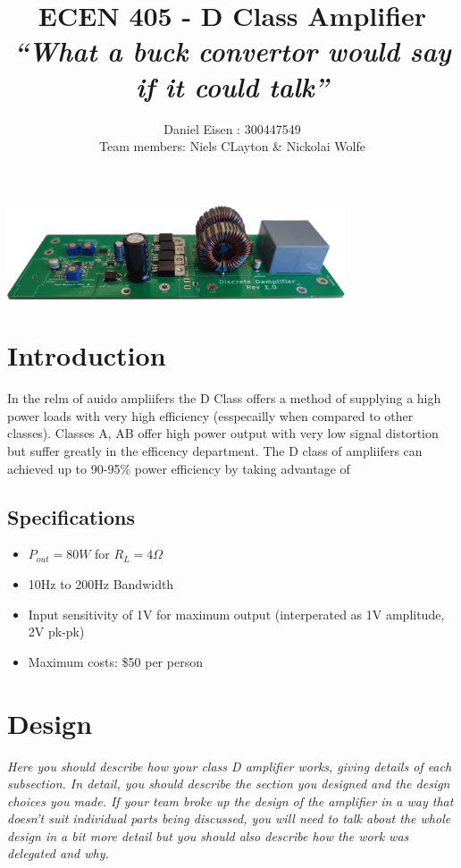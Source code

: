 \documentclass[11pt]{article}
\title{ECEN 405 -  D Class Amplifier \\ \large{\textit{``What a buck convertor would say if it could talk''}} }
\author{Daniel Eisen : 300447549 \\Team members: Niels CLayton \& Nickolai Wolfe}
\date{}
\begin{document}
\maketitle
\begin{center}
  \vspace*{-10mm}
  \includegraphics[width=0.75\textwidth]{img/real.png}
\end{center}{

\section{Introduction}

In the relm of auido ampliifers the D Class offers a method of supplying a high power loads with very high efficiency (esspecailly when compared to other classes). Classes A, AB offer high power output with very low signal distortion but suffer greatly in the efficency department. The D class of ampliifers can achieved up to 90-95\% power efficiency by taking advantage of 

\subsection*{Specifications}\label{S:spec}
\begin{itemize}
  \item $P_{out}=80W$ for $R_{L} = 4\Omega$
  \item 10Hz to 200Hz Bandwidth
  \item Input sensitivity of 1V for maximum output (interperated as 1V amplitude, 2V pk-pk)
  \item Maximum costs: \$50 per person
\end{itemize}

\section{Design}

\textit{Here you should describe how your class D amplifier works, giving details of each subsection.
In detail, you should describe the section you designed and the design choices you made. If your team broke up the design of the amplifier in a way that doesn’t suit individual parts being discussed, you will need to talk about the whole design in a bit more detail but you should also describe how the work was delegated and why.}
 
}
\end{document}
